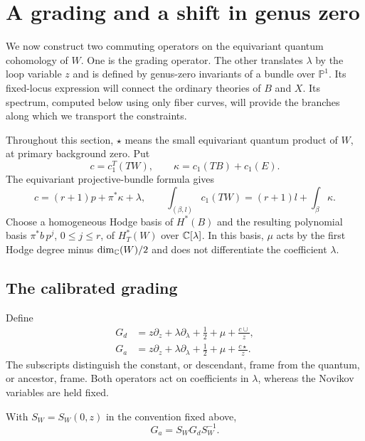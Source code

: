\section{A grading and a shift in genus zero}
\label{shift:section}

We now construct two commuting operators on the equivariant quantum
cohomology of $W$.  One is the grading operator.  The other translates
$\lambda$ by the loop variable $z$ and is defined by genus-zero invariants
of a bundle over $\mathbb P^1$.  Its fixed-locus expression will connect the
ordinary theories of $B$ and $X$.  Its spectrum, computed below using only
fiber curves, will provide the branches along which we transport the
constraints.

Throughout this section, $\star$ means the small equivariant quantum
product of $W$, at primary background zero.  Put
\[
 c=c_1^T(TW),\qquad
 \kappa=c_1(TB)+c_1(E).
\]
The equivariant projective-bundle formula gives
\begin{equation}
 c=(r+1)p+\pi^*\kappa+\lambda,
 \qquad
 \int_{(\beta,l)}c_1(TW)=(r+1)l+\int_\beta\kappa.
 \label{shift:c1}
\end{equation}
Choose a homogeneous Hodge basis of $H^*(B)$ and the resulting polynomial
basis $\pi^*b\,p^j$, $0\leq j\leq r$, of $H_T^*(W)$ over $\mathbb C[\lambda]$.
In this basis, $\mu$ acts by the first Hodge degree minus
$\dim_\mathbb C(W)/2$ and does not differentiate the coefficient $\lambda$.

\subsection{The calibrated grading}

Define
\begin{equation}
 \begin{split}
 G_d&=z\partial_z+\lambda\partial_\lambda+\tfrac12+\mu+\frac{c\cup}{z},\\
 G_a&=z\partial_z+\lambda\partial_\lambda+\tfrac12+\mu+\frac{c\star}{z}.
 \end{split}
 \label{shift:gradings}
\end{equation}
The subscripts distinguish the constant, or descendant, frame from the
quantum, or ancestor, frame.  Both operators act on coefficients in
$\lambda$, whereas the Novikov variables are held fixed.

\begin{lemma}
\label{shift:grading-lemma}
With $S_W=S_W(0,z)$ in the convention fixed above,
\begin{equation}
                 G_a=S_WG_dS_W^{-1}.
 \label{shift:grading-calibration}
\end{equation}
\end{lemma}

